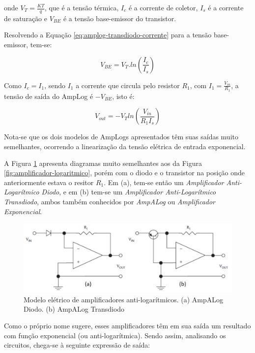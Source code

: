 \documentclass[a4paper]{instrumentacao}
\begin{document}
\noindent
onde $V_T=\frac{KT}{q}$, que é a tensão térmica, $I_c$ é a corrente de coletor, $I_s$ é a corrente de saturação e $V_{BE}$ é a tensão base-emissor do transistor.

Resolvendo a Equação \ref{eq:amplog-transdiodo-corrente} para a tensão base-emissor, tem-se:

\begin{equation}
	V_{BE}=V_T.ln \left ( \frac{I_c}{I_s} \right )
	\label{eq:amplog-transdiodo-tensao}
\end{equation}

Como $I_c=I_1$, sendo $I_1$ a corrente que circula pelo resistor $R_1$, com $I_1=\frac{V_{in}}{R_1}$, a tensão de saída do AmpLog é $-V_{BE}$, isto é:

\begin{equation}
	V_{out}= -V_T ln\left ( \frac{V_{in}}{R_1 I_s} \right )
	\label{eq:amplog-transdiodo-saida}
\end{equation}

Nota-se que os dois modelos de AmpLogs apresentados têm suas saídas muito semelhantes, ocorrendo a linearização da tensão elétrica de entrada exponencial.

A Figura \ref{fig:amplificador-antilogaritmico} apresenta diagramas muito semelhantes aos da Figura \ref{fig:amplificador-logaritmico}, porém com o diodo e o transistor na posição onde anteriormente estava o resitor $R_1$. Em (a), tem-se então um \textit{Amplificador Anti-Logarítmico Diodo}, e em (b) tem-se um \textit{Amplificador Anti-Logarítmico Transdiodo}, ambos também conhecidos por \textit{AmpALog} ou \textit{Amplificador Exponencial}.

\begin{figure}[H]
\center
\includegraphics[width=\textwidth]{amp_alog.jpg}
\caption{Modelo elétrico de amplificadores anti-logarítmicos. (a) AmpALog Diodo. (b) AmpALog Transdiodo}
\label{fig:amplificador-antilogaritmico}
\end{figure}

Como o próprio nome sugere, esses amplificadores têm em sua saída um resultado com função exponencial (ou anti-logarítmica). Sendo assim, analisando os circuitos, chega-se à seguinte expressão de saída:
\end{document}
